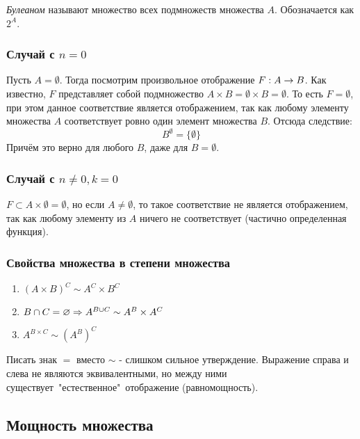 \begin{definition}
	\textit{Булеаном} называют множество всех подмножеств множества $A$. Обозначается как $2^A$.
\end{definition}

\subsubsection*{Случай с $n = 0$}

Пусть $A = \emptyset$. Тогда посмотрим произвольное отображение $F : A \rightarrow B$. Как известно, $F$ представляет собой подмножество $A \times B = \emptyset \times B = \emptyset$. То есть $F = \emptyset$, при этом данное соответствие является отображением, так как любому элементу множества $A$ соответствует ровно один элемент множества $B$. Отсюда следствие:
$$
	B^{\emptyset} = \{\emptyset\}
$$
Причём это верно для любого $B$, даже для $B = \emptyset$.

\subsubsection*{Случай с $n \neq 0, k = 0$}

$F \subset A \times \emptyset = \emptyset$, но если $A \neq \emptyset$, то такое соответствие не является отображением, так как любому элементу из $A$ ничего не соответствует (частично определенная функция).

\subsubsection*{Свойства множества в степени множества}

\begin{enumerate}
	\item $(A \times B)^C \sim A^C \times B^C$
	\item $B \cap C = \varnothing \Rightarrow A^{B \cup C} \sim A^B \times A^C$
	\item $A^{B \times C} \sim (A^B)^C$
\end{enumerate}

\begin{note}
	Писать знак $=$ вместо $\sim$ - слишком сильное утверждение. Выражение справа и слева не являются эквивалентными, но между ними существует\ "естественное"\ отображение (равномощность).
\end{note}

\subsection{Мощность множества}

